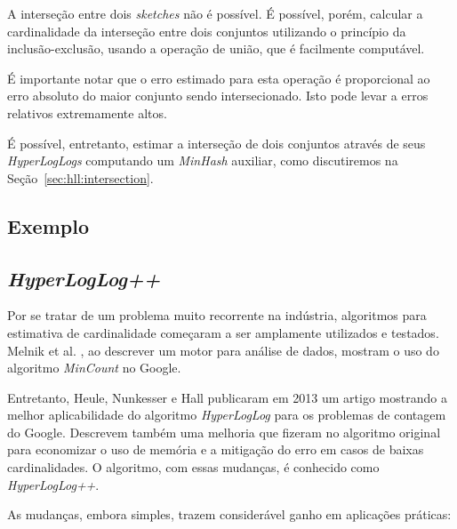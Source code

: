 A interseção entre dois \emph{sketches} não é possível. É possível, porém, calcular a cardinalidade da interseção entre dois conjuntos utilizando o princípio da inclusão-exclusão, usando a operação de união, que é facilmente computável.

É importante notar que o erro estimado para esta operação é proporcional ao erro absoluto do maior conjunto sendo intersecionado. Isto pode levar a erros relativos extremamente altos.

É possível, entretanto, estimar a interseção de dois conjuntos através de seus \emph{HyperLogLogs} computando um \emph{MinHash} auxiliar, como discutiremos na Seção~\ref{sec:hll:intersection}.

\subsection{Exemplo}\label{sec:hll:example}


\subsection{\emph{HyperLogLog++}}

Por se tratar de um problema muito recorrente na indústria, algoritmos para estimativa de cardinalidade começaram a ser amplamente utilizados e testados. Melnik et al. \cite{melnik2010dremel}, ao descrever um motor para análise de dados, mostram o uso do algoritmo \emph{MinCount} no Google.

Entretanto, Heule, Nunkesser e Hall publicaram em 2013 \cite{heule2013hyperloglog} um artigo mostrando a melhor aplicabilidade do algoritmo \emph{HyperLogLog} para os problemas de contagem do Google. Descrevem também uma melhoria que fizeram no algoritmo original para economizar o uso de memória e a mitigação do erro em casos de baixas cardinalidades. O algoritmo, com essas mudanças, é conhecido como \emph{HyperLogLog++}.

As mudanças, embora simples, trazem considerável ganho em aplicações práticas:

